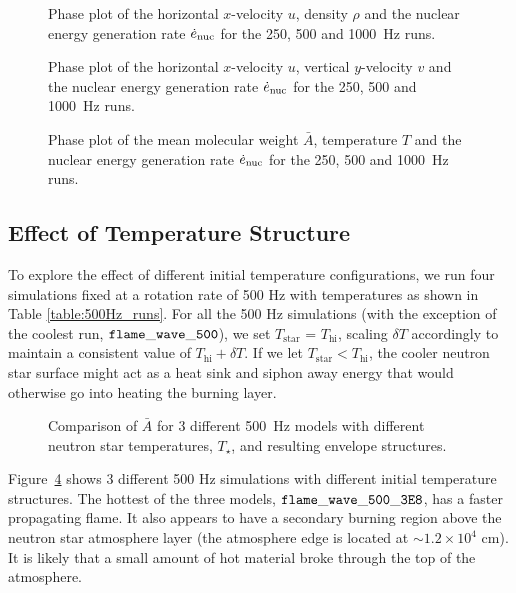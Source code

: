 \documentclass[preprint,times,tighten]{aastex63}
\begin{document}
\begin{figure}[t]
    \centering
    \caption{\label{fig:urho}Phase plot of the horizontal $x$-velocity $u$, density $\rho$ and the nuclear energy generation rate $\dot{e}_{\rm nuc}$ for the 250, 500 and 1000~Hz runs.}
\end{figure}

\begin{figure}[t]
    \centering
    \caption{\label{fig:uv}Phase plot of the horizontal $x$-velocity $u$, vertical $y$-velocity $v$ and the nuclear energy generation rate $\dot{e}_{\rm nuc}$ for the 250, 500 and 1000~Hz runs.}
\end{figure}

\begin{figure}[t]
    \centering
    \caption{\label{fig:abar}Phase plot of the mean molecular weight $\bar{A}$, temperature $T$ and the nuclear energy generation rate $\dot{e}_{\rm nuc}$ for the 250, 500 and 1000~Hz runs.}
\end{figure}
    

\subsection{Effect of Temperature Structure}\label{ssec:temp_structure}

To explore the effect of different initial temperature configurations, we run four simulations fixed at a rotation rate of 500 Hz with temperatures as shown in Table \ref{table:500Hz_runs}. For all the 500 Hz simulations (with the exception of the coolest run, $\tt{flame\_wave\_500}$), we set $T_\mathrm{star}$ = $T_\mathrm{hi}$, scaling $\delta T$ accordingly to maintain a consistent value of $T_\mathrm{hi} + \delta T$. If we let $T_\mathrm{star} < T_\mathrm{hi}$, the cooler neutron star surface might act as a heat sink and siphon away energy that would otherwise go into heating the burning layer.

\begin{figure}[t]
\centering
{}
\caption{\label{fig:compare_500Hz_abar} Comparison of $\bar{A}$ for 3 different 500~Hz models with different neutron star temperatures, $T_\star$, and resulting envelope structures. } %
\end{figure}

Figure~\ref{fig:compare_500Hz_abar} shows 3 different 500 Hz simulations with different initial temperature structures. The hottest of the three models, $\tt{flame\_wave\_500\_3E8}$, has a faster propagating flame. It also appears to have a secondary burning region above the neutron star atmosphere layer (the atmosphere edge is located at $\sim 1.2\times 10^4$ cm). It is likely that a small amount of hot material broke through the top of the atmosphere.
\end{document}
